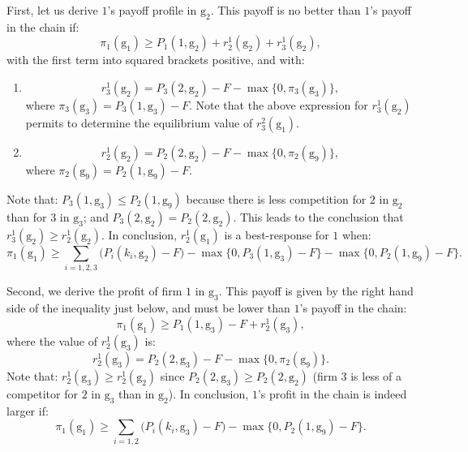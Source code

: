 \documentclass{article}
\begin{document}
\indent First, let us derive $1$'s payoff profile in $\text{g}_2$. This payoff is no better than $1$'s payoff in the chain if: 
\begin{equation*}
  \pi_1(\text{g}_1) \geq P_1(1,\text{g}_2) +r^1_2(\text{g}_2)+ r^1_3(\text{g}_2),
\end{equation*}
with the first term into squared brackets positive, and with: 
\begin{enumerate}
    \item \begin{equation*}
    r^1_3(\text{g}_2)= P_3(2,\text{g}_2)-F-\max\{0, \pi_3(\text{g}_3)\}, 
\end{equation*}
where $\pi_3(\text{g}_3)= P_3(1,\text{g}_3)-F$. Note that the above expression for $r^1_3(\text{g}_2)$ permits to determine the equilibrium value of $r^2_3(\text{g}_1)$. 
\item \begin{equation*}
        r^1_2(\text{g}_2)= P_2(2,\text{g}_2)-F-\max\{0,\pi_2(\text{g}_9)\},
      \end{equation*}
where $\pi_2(\text{g}_9)=P_2(1,\text{g}_9)-F$.       
\end{enumerate}
Note that: $P_3(1,\text{g}_3)\leq P_2(1,\text{g}_9)$ because there is less competition for $2$ in $\text{g}_2$ than for $3$ in $\text{g}_3$; and $P_3(2,\text{g}_2)=P_2(2,\text{g}_2)$. This leads to the conclusion that $r^1_3(\text{g}_2)\geq r^1_2(\text{g}_2)$. In conclusion, $r^1_2(\text{g}_1)$ is a best-response for $1$ when: 
\begin{equation}
    \pi_1(\text{g}_1) \geq \sum_{i=1,2,3} \big(P_i(k_i, \text{g}_2)-F\big) -\max\{0, P_3(1,\text{g}_3)-F\} - \max\{0, P_2(1,\text{g}_9)-F\}. \label{dev1}
\end{equation}

\indent Second, we derive the profit of firm $1$ in $\text{g}_3$. This payoff is given by the right hand side of the inequality just below, and must be lower than $1$'s payoff in the chain: 
\begin{equation*}
    \pi_1(\text{g}_1) \geq P_1(1,\text{g}_3)-F +r^1_2(\text{g}_3),
\end{equation*}
where the value of $r^1_2(\text{g}_3)$ is: 
\begin{equation*}
    r^1_2(\text{g}_3)= P_2(2,\text{g}_3)-F- \max\{0,\pi_2(\text{g}_9)\}. 
\end{equation*}
Note that: $r^1_2(\text{g}_3)\geq r^1_2(\text{g}_2)$ since $P_2(2,\text{g}_3)\geq P_2(2,\text{g}_2)$ (firm $3$ is less of a competitor for $2$ in $\text{g}_3$ than in $\text{g}_2$). In conclusion, $1$'s profit in the chain is indeed larger if: 
\begin{equation*}
    \pi_1(\text{g}_1)\geq \sum_{i=1,2} \big(P_i(k_i, \text{g}_3)-F\big) - \max\{0,P_2(1,\text{g}_9)-F\}. 
\end{equation*}
\end{document}
